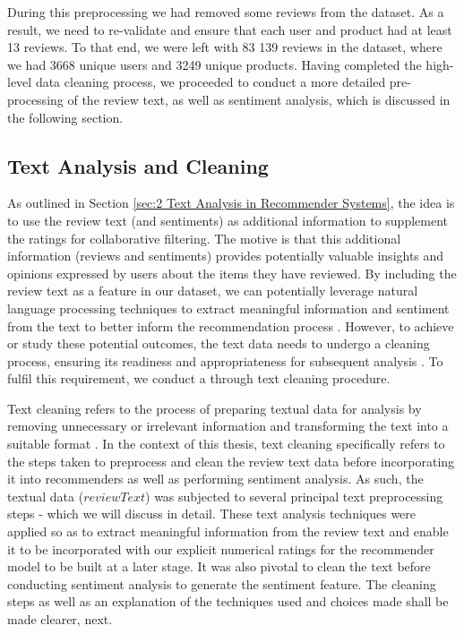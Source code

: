During this preprocessing we had removed some reviews from the dataset. As a result, we need to re-validate and ensure that each user and product had at least 13 reviews. To that end, we were left with 83 139 reviews in the dataset, where we had 3668 unique users and 3249 unique products. Having completed the high-level data cleaning process, we proceeded to conduct a more detailed pre-processing of the review text, as well as sentiment analysis, which is discussed in the following section.

\subsection{Text Analysis and Cleaning}
\label{subsec:3 Text Analysis and Cleaning}

As outlined in Section \ref{sec:2 Text Analysis in Recommender Systems}, the idea is to use the review text (and sentiments) as additional information to supplement the ratings for collaborative filtering. The motive is that this additional information (reviews and sentiments) provides potentially valuable insights and opinions expressed by users about the items they have reviewed. By including the review text as a feature in our dataset, we can potentially leverage natural language processing techniques to extract meaningful information and sentiment from the text to better inform the recommendation process \cite{leino2007case}. However, to achieve or study these potential outcomes, the text data needs to undergo a cleaning process, ensuring its readiness and appropriateness for subsequent  analysis \cite{chen2015augmenting}. To fulfil this requirement, we conduct a through text cleaning procedure. 

Text cleaning refers to the process of preparing textual data for analysis by removing unnecessary or irrelevant information and transforming the text into a suitable format \cite{gharatkar2017review}. In the context of this thesis, text cleaning specifically refers to the steps taken to preprocess and clean the review text data before incorporating it into recommenders as well as performing sentiment analysis. As such, the textual data ($reviewText$) was subjected to several principal text preprocessing steps - which we will discuss in detail. These text analysis techniques were applied so as to extract meaningful information from the review text and enable it to be incorporated with our explicit numerical ratings for the recommender model to be built at a later stage. It was also pivotal to clean the text before conducting sentiment analysis to generate the sentiment feature. The cleaning steps as well as an explanation of the techniques used and choices made shall be made clearer, next.


